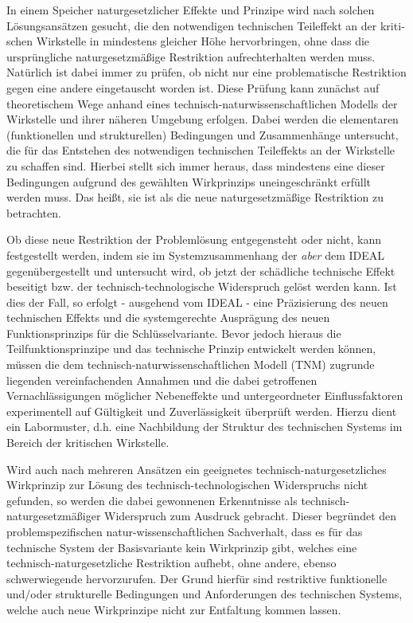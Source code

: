\documentclass[12pt,a4paper]{article}
\begin{document}
In einem Speicher naturgesetzlicher Effekte und Prinzipe wird nach solchen Lösungsansätzen gesucht, die den notwendigen technischen Teileffekt an der kriti­schen Wirkstelle in mindestens gleicher Höhe hervorbringen, ohne dass die ursprüngliche naturgesetzmäßige Restriktion aufrechterhalten werden muss. Natürlich ist dabei immer zu prüfen, ob nicht nur eine problematische Restriktion gegen eine andere eingetauscht worden ist. Diese Prüfung kann zunächst auf theoretischem Wege anhand eines technisch-naturwissenschaftlichen Modells der Wirkstelle und ihrer näheren Umgebung erfolgen. Dabei werden die ele­mentaren (funktionellen und strukturellen) Bedingungen und Zusam­menhänge untersucht, die für das Entstehen des notwendigen tech­nischen Teileffekts an der Wirkstelle zu schaffen sind. Hierbei stellt sich immer heraus, dass mindestens eine dieser Bedingungen aufgrund des gewählten Wirkprinzips uneingeschränkt erfüllt werden muss. Das heißt, sie ist als die neue naturgesetzmäßige Restriktion zu betrachten.

Ob diese neue Restriktion der Problemlösung entgegensteht oder nicht, kann festgestellt werden, indem sie im Systemzusammenhang der \emph{aber} dem IDEAL gegenübergestellt und untersucht wird, ob jetzt der schädliche technische Effekt beseitigt bzw. der tech­nisch-technologische Widerspruch gelöst werden kann. Ist dies der Fall, so erfolgt - ausgehend vom IDEAL - eine Präzisierung des neuen technischen Effekts und die systemgerechte Ausprägung des neuen Funktionsprinzips für die Schlüsselvariante. Bevor jedoch hieraus die Teilfunktionsprinzipe und das technische Prinzip ent­wickelt werden können, müssen die dem technisch-naturwissenschaft­lichen Modell (TNM) zugrunde liegenden vereinfachenden Annahmen und die dabei getroffenen Vernachlässigungen möglicher Nebeneffekte und untergeordneter Einflussfaktoren experimentell auf Gültigkeit und Zuverlässigkeit überprüft werden. Hierzu dient ein Labormuster, d.h. eine Nachbildung der Struktur des technischen Systems im Bereich der kritischen Wirkstelle.

Wird auch nach mehreren Ansätzen ein geeignetes technisch-naturgesetzliches Wirkprinzip zur Lösung des technisch-technologischen Widerspruchs nicht gefunden, so werden die dabei gewonnenen Erkenntnisse als technisch-naturgesetzmäßiger Widerspruch zum Ausdruck gebracht. Dieser begründet den problemspezifischen natur-wissenschaftlichen Sachverhalt, dass es für das technische System der Basisvariante kein Wirkprinzip gibt, welches eine technisch-naturgesetzliche Restriktion aufhebt, ohne andere, ebenso schwerwiegende hervorzurufen. Der Grund hierfür sind restriktive funktionelle und/oder strukturelle Bedingungen und Anforderungen des technischen Systems, welche auch neue Wirkprinzipe nicht zur Entfaltung kommen lassen.
\end{document}

